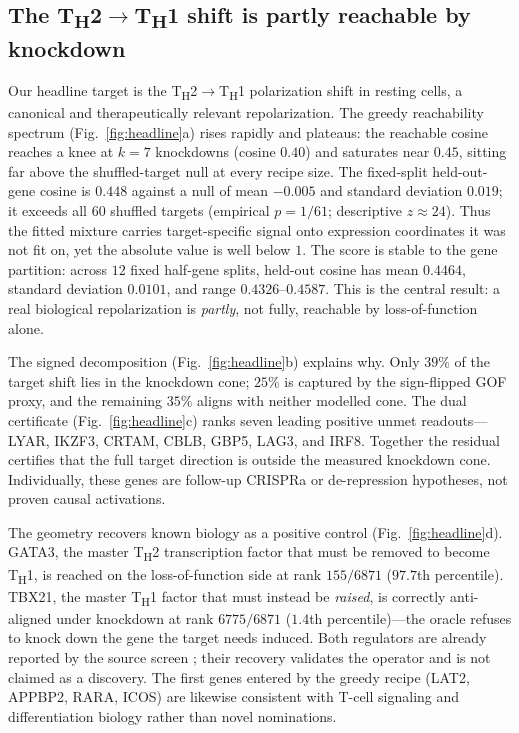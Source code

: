 \subsection{The T\texorpdfstring{\textsubscript{H}}{H}2\texorpdfstring{$\rightarrow$}{->}T\texorpdfstring{\textsubscript{H}}{H}1 shift is partly reachable by knockdown}
\label{sec:results-headline}
Our headline target is the T\textsubscript{H}2$\rightarrow$T\textsubscript{H}1 polarization
shift in resting cells, a canonical and therapeutically relevant repolarization. The greedy
reachability spectrum (Fig.~\ref{fig:headline}a) rises rapidly and plateaus: the reachable
cosine reaches a knee at $k=7$ knockdowns (cosine $0.40$) and saturates near $0.45$, sitting
far above the shuffled-target null at every recipe size. The fixed-split held-out-gene cosine
is $0.448$ against a null of mean $-0.005$ and standard deviation $0.019$; it exceeds all $60$
shuffled targets (empirical $p=1/61$; descriptive $z\approx24$). Thus the fitted mixture carries
target-specific signal onto expression coordinates it was not fit on, yet the absolute value
is well below $1$. The score is stable to the gene partition: across $12$ fixed half-gene
splits, held-out cosine has mean $0.4464$, standard deviation $0.0101$, and range
$0.4326$--$0.4587$. This is the central
result: a real biological repolarization is \emph{partly}, not fully, reachable by
loss-of-function alone.

The signed decomposition (Fig.~\ref{fig:headline}b) explains why. Only $39\%$ of the target
shift lies in the knockdown cone; $25\%$ is captured by the sign-flipped GOF proxy, and the
remaining $35\%$ aligns with neither modelled cone. The dual certificate
(Fig.~\ref{fig:headline}c) ranks seven leading positive unmet readouts---LYAR, IKZF3, CRTAM,
CBLB, GBP5, LAG3, and IRF8. Together the residual certifies that the full target direction is
outside the measured knockdown cone. Individually, these genes are follow-up CRISPRa or
de-repression hypotheses, not proven causal activations.

The geometry recovers known biology as a positive control (Fig.~\ref{fig:headline}d). GATA3,
the master T\textsubscript{H}2 transcription factor that must be removed to become
T\textsubscript{H}1, is reached on the loss-of-function side at rank $155/6871$ ($97.7$th
percentile). TBX21, the master T\textsubscript{H}1 factor that must instead be
\emph{raised}, is correctly anti-aligned under knockdown at rank $6775/6871$ ($1.4$th
percentile)---the oracle refuses to knock down the gene the target needs induced. Both
regulators are already reported by the source screen \citep{Zhu2025}; their recovery
validates the operator and is not claimed as a discovery. The first genes entered by the
greedy recipe (LAT2, APPBP2, RARA, ICOS) are likewise consistent with T-cell signaling and
differentiation biology rather than novel nominations.

